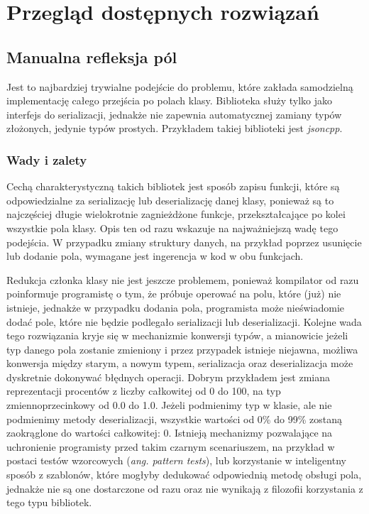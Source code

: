 \documentclass[12pt]{article}
\newcommand{\n}{\newline}
\begin{document}
	{
		\section{Przegląd dostępnych rozwiązań}

		{
			\subsection{Manualna refleksja pól}

			Jest to najbardziej trywialne podejście do problemu, które zakłada samodzielną implementację całego przejścia
			po polach klasy. Biblioteka służy tylko jako interfejs do serializacji, jednakże nie zapewnia automatycznej
			zamiany typów złożonych, jedynie typów prostych. Przykładem takiej biblioteki jest {\it jsoncpp}\cite{jsoncpp_repo}.\n

			{
				\subsubsection{Wady i zalety}

				Cechą charakterystyczną takich bibliotek jest sposób zapisu funkcji, które są odpowiedzialne za serializację lub deserializację
				danej klasy, ponieważ są to najczęściej długie wielokrotnie zagnieżdżone funkcje, przekształcające po kolei wszystkie pola klasy.
				Opis ten od razu wskazuje na najważniejszą wadę tego podejścia. W przypadku zmiany struktury danych, na przykład poprzez usunięcie
				lub dodanie pola, wymagane jest ingerencja w kod w obu funkcjach.\n

				Redukcja członka klasy nie jest jeszcze problemem, ponieważ kompilator od razu poinformuje programistę o tym, że próbuje operować na polu,
				które (już) nie istnieje, jednakże w przypadku dodania pola, programista może nieświadomie dodać pole, które nie będzie podlegało serializacji
				lub deserializacji. Kolejne wada tego rozwiązania kryje się w mechanizmie konwersji typów, a mianowicie jeżeli typ danego pola zostanie
				zmieniony i przez przypadek istnieje niejawna, możliwa konwersja między starym, a nowym typem, serializacja oraz deserializacja może
				dyskretnie dokonywać błędnych operacji. Dobrym przykładem jest zmiana reprezentacji procentów z liczby całkowitej od 0 do 100,
				na typ zmiennoprzecinkowy od 0.0 do 1.0. Jeżeli podmienimy typ w klasie, ale nie podmienimy metody deserializacji, wszystkie wartości
				od 0\% do 99\% zostaną zaokrąglone do wartości całkowitej: 0. Istnieją mechanizmy pozwalające na uchronienie programisty przed takim
				czarnym scenariuszem, na przykład w postaci testów wzorcowych ({\it ang. pattern tests}), lub korzystanie w inteligentny sposób z szablonów,
				które mogłyby dedukować odpowiednią metodę obsługi pola, jednakże nie są one dostarczone od razu oraz nie wynikają z filozofii
				korzystania z tego typu bibliotek.\n

}}}
\end{document}
